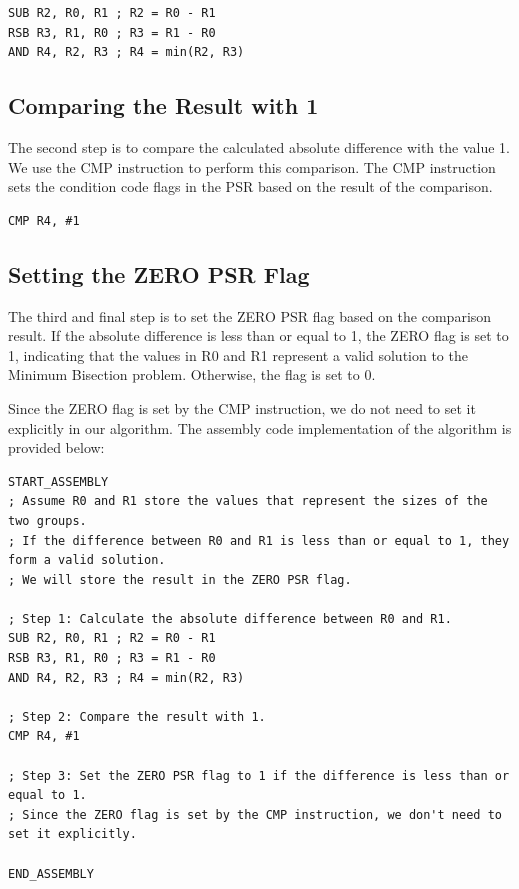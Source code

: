 \begin{verbatim}
SUB R2, R0, R1 ; R2 = R0 - R1
RSB R3, R1, R0 ; R3 = R1 - R0
AND R4, R2, R3 ; R4 = min(R2, R3)
\end{verbatim}

\subsection{Comparing the Result with 1}

The second step is to compare the calculated absolute difference with the value 1. We use the CMP instruction to perform this comparison. The CMP instruction sets the condition code flags in the PSR based on the result of the comparison.

\begin{verbatim}
CMP R4, #1
\end{verbatim}

\subsection{Setting the ZERO PSR Flag}

The third and final step is to set the ZERO PSR flag based on the comparison result. If the absolute difference is less than or equal to 1, the ZERO flag is set to 1, indicating that the values in R0 and R1 represent a valid solution to the Minimum Bisection problem. Otherwise, the flag is set to 0.

Since the ZERO flag is set by the CMP instruction, we do not need to set it explicitly in our algorithm. The assembly code implementation of the algorithm is provided below:

\begin{verbatim}
START_ASSEMBLY
; Assume R0 and R1 store the values that represent the sizes of the two groups.
; If the difference between R0 and R1 is less than or equal to 1, they form a valid solution.
; We will store the result in the ZERO PSR flag.

; Step 1: Calculate the absolute difference between R0 and R1.
SUB R2, R0, R1 ; R2 = R0 - R1
RSB R3, R1, R0 ; R3 = R1 - R0
AND R4, R2, R3 ; R4 = min(R2, R3)

; Step 2: Compare the result with 1.
CMP R4, #1

; Step 3: Set the ZERO PSR flag to 1 if the difference is less than or equal to 1.
; Since the ZERO flag is set by the CMP instruction, we don't need to set it explicitly.

END_ASSEMBLY
\end{verbatim}

